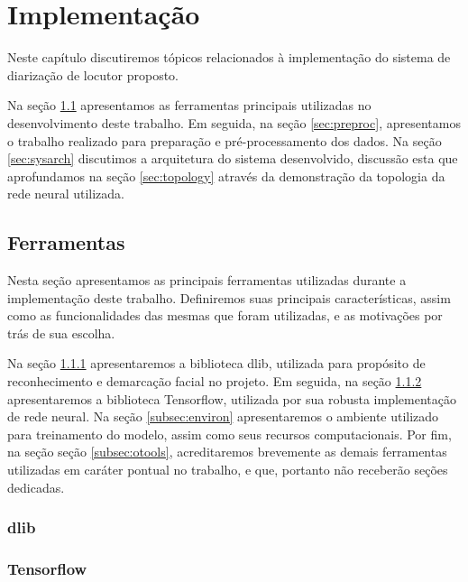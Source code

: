 \chapter{Implementação}
\label{chap:impl}

Neste capítulo discutiremos tópicos relacionados à implementação do sistema de diarização de locutor proposto. 

Na seção \ref{sec:tools} apresentamos as ferramentas principais utilizadas no desenvolvimento deste trabalho. Em seguida, na seção \ref{sec:preproc}, apresentamos o trabalho realizado para preparação e pré-processamento dos dados. Na seção \ref{sec:sysarch} discutimos a arquitetura do sistema desenvolvido, discussão esta que aprofundamos na seção \ref{sec:topology} através da demonstração da topologia da rede neural utilizada.

\section{Ferramentas}
\label{sec:tools}

Nesta seção apresentamos as principais ferramentas utilizadas durante a implementação deste trabalho. Definiremos suas principais características, assim como as funcionalidades das mesmas que foram utilizadas, e as motivações por trás de sua escolha.

Na seção \ref{subsec:dlib} apresentaremos a biblioteca dlib, utilizada para propósito de reconhecimento e demarcação facial no projeto. Em seguida, na seção \ref{subsec:tf} apresentaremos a biblioteca Tensorflow, utilizada por sua robusta implementação de rede neural. Na seção \ref{subsec:environ} apresentaremos o ambiente utilizado para treinamento do modelo, assim como seus recursos computacionais. Por fim, na seção seção \ref{subsec:otools}, acreditaremos brevemente as demais ferramentas utilizadas em caráter pontual no trabalho, e que, portanto não receberão seções dedicadas.

\subsection{dlib}
\label{subsec:dlib}
\cite{dlib09}

\subsection{Tensorflow}
\label{subsec:tf}
\cite{tensorflow2015-whitepaper}

